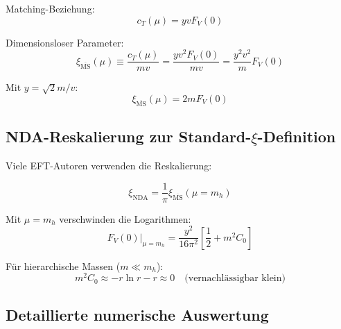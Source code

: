 \documentclass[12pt,a4paper]{article}
\theoremstyle{definition}
\begin{document}
	Matching-Beziehung:
	\begin{equation}
		c_T(\mu) = y v F_V(0)
	\end{equation}
	
	Dimensionsloser Parameter:
	\begin{equation}
		\xi_{\overline{\text{MS}}}(\mu) \equiv \frac{c_T(\mu)}{mv} = \frac{yv^2F_V(0)}{mv} = \frac{y^2v^2}{m}F_V(0)
	\end{equation}
	
	Mit $y = \sqrt{2} m/v$:
	\begin{equation}
		\xi_{\overline{\text{MS}}}(\mu) = 2mF_V(0)
	\end{equation}
	
	\subsection{NDA-Reskalierung zur Standard-$\xi$-Definition}
	
	Viele EFT-Autoren verwenden die Reskalierung:
	
	\begin{equation}
		\xi_{\text{NDA}} = \frac{1}{\pi} \xi_{\overline{\text{MS}}}(\mu = m_h)
	\end{equation}
	
	Mit $\mu = m_h$ verschwinden die Logarithmen:
	\begin{equation}
		F_V(0)|_{\mu=m_h} = \frac{y^2}{16\pi^2}\left[\frac{1}{2} + m^2C_0\right]
	\end{equation}
	
	Für hierarchische Massen ($m \ll m_h$):
	\begin{equation}
		m^2C_0 \approx -r \ln r - r \approx 0 \quad \text{(vernachlässigbar klein)}
	\end{equation}
	
	\subsection{Detaillierte numerische Auswertung}
	
\end{document}

